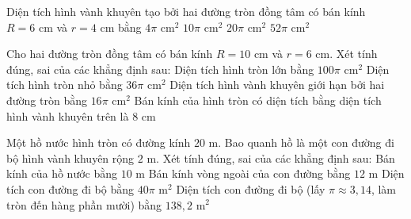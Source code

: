\begin{ex}%
	Diện tích hình vành khuyên tạo bởi hai đường tròn đồng tâm có bán kính $R = 6\text{ cm}$ và $r = 4\text{ cm}$ bằng
	\choice
	{$4\pi\text{ cm}^2$}
	{$10\pi\text{ cm}^2$}
	{\True $20\pi\text{ cm}^2$}
	{$52\pi\text{ cm}^2$}
\end{ex}

\begin{ex}%
	Cho hai đường tròn đồng tâm có bán kính $R = 10\text{ cm}$ và $r = 6\text{ cm}$. Xét tính đúng, sai của các khẳng định sau:
	\choiceTF
	{\True Diện tích hình tròn lớn bằng $100\pi\text{ cm}^2$}
	{\True Diện tích hình tròn nhỏ bằng $36\pi\text{ cm}^2$}
	{Diện tích hình vành khuyên giới hạn bởi hai đường tròn bằng $16\pi\text{ cm}^2$}
	{\True Bán kính của hình tròn có diện tích bằng diện tích hình vành khuyên trên là $8\text{ cm}$}
\end{ex}

\begin{ex}%
	Một hồ nước hình tròn có đường kính $20\text{ m}$. Bao quanh hồ là một con đường đi bộ hình vành khuyên rộng $2\text{ m}$. Xét tính đúng, sai của các khẳng định sau:
	\choiceTF
	{\True Bán kính của hồ nước bằng $10\text{ m}$}
	{\True Bán kính vòng ngoài của con đường bằng $12\text{ m}$}
	{Diện tích con đường đi bộ bằng $40\pi\text{ m}^2$}
	{\True Diện tích con đường đi bộ (lấy $\pi \approx 3{,}14$, làm tròn đến hàng phần mười) bằng $138{,}2\text{ m}^2$}
\end{ex}

